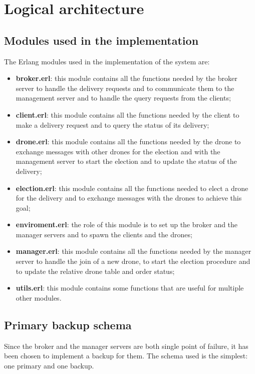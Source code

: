 \documentclass[a4paper, oneside]{memoir}
\begin{document}
\section{Logical architecture}
\subsection{Modules used in the implementation}
The Erlang modules used in the implementation of the system are:
\begin{itemize}
\item \textbf{broker.erl}: this module contains all the functions needed by the broker server to handle the delivery requests and to communicate them to the management server and to handle the query requests from the clients;
\item \textbf{client.erl}: this module contains all the functions needed by the client to make a delivery request and to query the status of its delivery;
\item \textbf{drone.erl}: this module contains all the functions needed by the drone to exchange messages with other drones for the election and with the management server to start the election and to update the status of the delivery;
\item \textbf{election.erl}: this module contains all the functions needed to elect a drone for the delivery and to exchange messages with the drones to achieve this goal;
\item \textbf{enviroment.erl}: the role of this module is to set up the broker and the manager servers and to spawn the clients and the drones;
\item \textbf{manager.erl}: this module contains all the functions needed by the manager server to handle the join of a new drone, to start the election procedure and to update the relative drone table and order status;
\item \textbf{utils.erl}: this module contains some functions that are useful for multiple other modules.
\end{itemize}
\subsection{Primary backup schema}
Since the broker and the manager servers are both single point of failure, it has been chosen to implement a backup for them. The schema used is the simplest: one primary and one backup.
\end{document}
